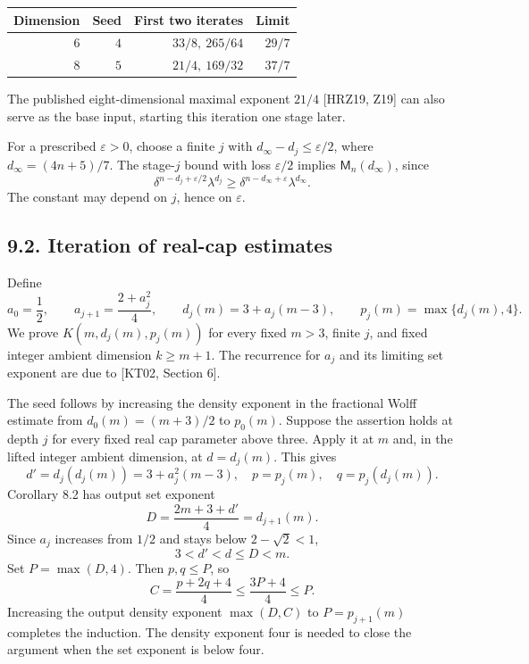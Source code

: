 \documentclass[
  11pt,
  a4paper,
]{article}
\begin{document}
\begin{longtable}[]{@{}rrrr@{}}
\toprule\noalign{}
Dimension & Seed & First two iterates & Limit \\
\midrule\noalign{}
\endhead
\bottomrule\noalign{}
\endlastfoot
\(6\) & \(4\) & \(33/8,\ 265/64\) & \(29/7\) \\
\(8\) & \(5\) & \(21/4,\ 169/32\) & \(37/7\) \\
\end{longtable}

The published eight-dimensional maximal exponent \(21/4\) {[}HRZ19,
Z19{]} can also serve as the base input, starting this iteration one
stage later.

For a prescribed \(\varepsilon>0\), choose a finite \(j\) with
\(d_\infty-d_j\le\varepsilon/2\), where \(d_\infty=(4n+5)/7\). The
stage-\(j\) bound with loss \(\varepsilon/2\) implies
\(\mathsf M_n(d_\infty)\), since \[
 \delta^{n-d_j+\varepsilon/2}\lambda^{d_j}
 \ge\delta^{n-d_\infty+\varepsilon}\lambda^{d_\infty}.
\] The constant may depend on \(j\), hence on \(\varepsilon\).

\hypertarget{iteration-of-real-cap-estimates}{%
\subsection{9.2. Iteration of real-cap
estimates}\label{iteration-of-real-cap-estimates}}

Define \[
 a_0=\frac12,\qquad a_{j+1}=\frac{2+a_j^2}{4},
 \qquad d_j(m)=3+a_j(m-3),
 \qquad p_j(m)=\max\{d_j(m),4\}.                    \tag{9.4}\label{eq:9.4}
\] We prove \(K(m,d_j(m),p_j(m))\) for every fixed \(m>3\), finite
\(j\), and fixed integer ambient dimension \(k\ge m+1\). The recurrence
for \(a_j\) and its limiting set exponent are due to {[}KT02, Section
6{]}.

The seed follows by increasing the density exponent in the fractional
Wolff estimate from \(d_0(m)=(m+3)/2\) to \(p_0(m)\). Suppose the
assertion holds at depth \(j\) for every fixed real cap parameter above
three. Apply it at \(m\) and, in the lifted integer ambient dimension,
at \(d=d_j(m)\). This gives \[
 d'=d_j(d_j(m))=3+a_j^2(m-3),
 \quad p=p_j(m),\quad q=p_j(d_j(m)).
\] Corollary 8.2 has output set exponent \[
 D=\frac{2m+3+d'}4=d_{j+1}(m).
\] Since \(a_j\) increases from \(1/2\) and stays below \(2-\sqrt2<1\),
\[
 3<d'<d\le D<m.
\] Set \(P=\max(D,4)\). Then \(p,q\le P\), so \[
 C=\frac{p+2q+4}{4}
 \le\frac{3P+4}{4}\le P.                          \tag{9.5}\label{eq:9.5}
\] Increasing the output density exponent \(\max(D,C)\) to
\(P=p_{j+1}(m)\) completes the induction. The density exponent four is
needed to close the argument when the set exponent is below four.
\end{document}
